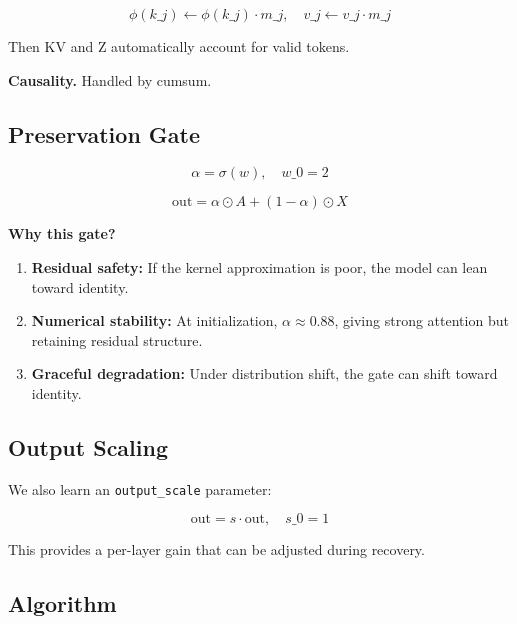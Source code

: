 \[
\phi(k\_j) \leftarrow \phi(k\_j) \cdot m\_j, \quad
v\_j \leftarrow v\_j \cdot m\_j
\tag{4.12}
\]

Then $\text{KV}$ and $\text{Z}$ automatically account for valid tokens.

\textbf{Causality.} Handled by cumsum.

\subsection{Preservation Gate}

\[
\alpha = \sigma(w), \quad w\_0 = 2
\tag{4.13}
\]

\[
\text{out} = \alpha \odot A + (1 - \alpha) \odot X
\tag{4.14}
\]

\textbf{Why this gate?}

\begin{enumerate}
\item \textbf{Residual safety:} If the kernel approximation is poor, the model
  can lean toward identity.
\item \textbf{Numerical stability:} At initialization, $\alpha \approx 0.88$,
  giving strong attention but retaining residual structure.
\item \textbf{Graceful degradation:} Under distribution shift, the gate can
  shift toward identity.

\end{enumerate}
\subsection{Output Scaling}

We also learn an \texttt{output\_scale} parameter:

\[
\text{out} = s \cdot \text{out}, \quad s\_0 = 1
\tag{4.15}
\]

This provides a per-layer gain that can be adjusted during recovery.

\subsection{Algorithm}

